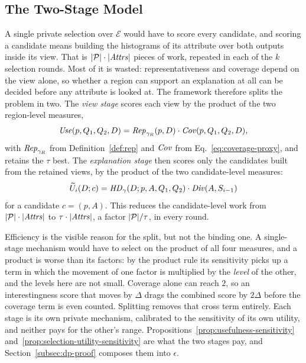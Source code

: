 \subsection{The Two-Stage Model}
\label{subsec:two-stages}

A single private selection over $\mathcal{E}$ would have to score every candidate, and scoring a candidate means building the histograms of its attribute over both outputs inside its view.
That is $|\mathcal{P}|\cdot|\mathit{Attrs}|$ pieces of work, repeated in each of the $k$ selection rounds.
Most of it is wasted: representativeness and coverage depend on the view alone, so whether a region can support an explanation at all can be decided before any attribute is looked at.
The framework therefore splits the problem in two.
The \emph{view stage} scores each view by the product of the two region-level measures,
\begin{equation}
\mathit{Use}(p,Q_1,Q_2,D)= \mathit{Rep}_{\gamma_R}(p,D)\cdot \mathit{Cov}(p,Q_1,Q_2,D),
\label{eq:usefulness-proxy}
\end{equation}
with $\mathit{Rep}_{\gamma_R}$ from Definition~\ref{def:rep} and $\mathit{Cov}$ from Eq.~\eqref{eq:coverage-proxy}, and retains the $\tau$ best.
The \emph{explanation stage} then scores only the candidates built from the retained views, by the product of the two candidate-level measures:
\begin{equation}
\widetilde{U}_i(D;c)=\mathit{HD}_{\gamma}(D;p,A,Q_1,Q_2)\cdot \mathit{Div}(A,S_{i-1})
\label{eq:selection-utility}
\end{equation}
for a candidate $c=(p,A)$.
This reduces the candidate-level work from $|\mathcal{P}|\cdot|\mathit{Attrs}|$ to $\tau\cdot|\mathit{Attrs}|$, a factor $|\mathcal{P}|/\tau$, in every round.

Efficiency is the visible reason for the split, but not the binding one.
A single-stage mechanism would have to select on the product of all four measures, and a product is worse than its factors: by the product rule its sensitivity picks up a term in which the movement of one factor is multiplied by the \emph{level} of the other, and the levels here are not small.
Coverage alone can reach $2$, so an interestingness score that moves by $\Delta$ drags the combined score by $2\Delta$ before the coverage term is even counted.
Splitting removes that cross term entirely.
Each stage is its own private mechanism, calibrated to the sensitivity of its own utility, and neither pays for the other's range.
Propositions~\ref{prop:usefulness-sensitivity} and~\ref{prop:selection-utility-sensitivity} are what the two stages pay, and Section~\ref{subsec:dp-proof} composes them into $\epsilon$.
\begin{proposition}
\label{prop:usefulness-sensitivity}
\end{proposition}

